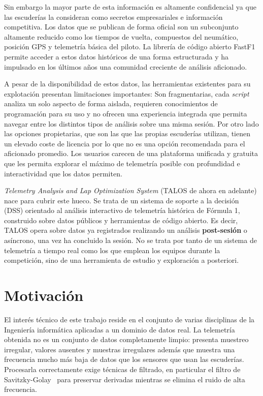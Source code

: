 \documentclass[12pt,a4paper,twoside,openright]{book}
\begin{document}
\medskip \noindent Sin embargo la mayor parte de esta información es altamente confidencial ya que las escuderías la consideran como secretos empresariales e información competitiva.
Los datos que se publican de forma oficial son un subconjunto altamente reducido como los tiempos de vuelta, compuestos del neumático, posición GPS y telemetría básica del piloto. La librería de código abierto FastF1 permite acceder a estos datos históricos de una forma estructurada y ha impulsado
en los últimos años una comunidad creciente de análisis aficionado.

\noindent A pesar de la disponibilidad de estos datos, las herramientas existentes para su explotación presentan limitaciones importantes: Son fragmentarias, cada \textit{script} analiza un solo aspecto de forma aislada, requieren conocimientos de programación para su uso y no ofrecen
una experiencia integrada que permita navegar entre los distintos tipos de análisis sobre una misma sesión. Por otro lado las opciones propietarias, que son las que las propias escuderías utilizan, tienen un elevado coste de licencia por lo que no es una opción recomendada para el aficionado promedio.
Los usuarios carecen de una plataforma unificada y gratuita que les permita explorar el máximo de telemetría posible con profundidad e interactividad que los datos permiten.

\noindent \textit{Telemetry Analysis and Lap Optimization System} (TALOS de ahora en adelante) nace para cubrir este hueco. Se trata de un sistema de soporte a la decisión (DSS) orientado al análisis interactivo de telemetría histórica de Fórmula 1, construido sobre datos públicos y herramientas de código abierto.
Es decir, TALOS opera sobre datos ya registrados realizando un análisis \textbf{post-sesión} o asíncrono, una vez ha concluido la sesión. No se trata por tanto de un sistema de telemetría a tiempo real como los que emplean los equipos durante la competición, sino de una herramienta de estudio y exploración a posteriori.
\section{Motivación}
El interés técnico de este trabajo reside en el conjunto de varias disciplinas de la Ingeniería informática aplicadas a un dominio de datos real. La telemetría obtenida no es un conjunto de datos completamente limpio:
presenta muestreo irregular, valores ausentes y muestras irregulares además que muestra una frecuencia mucho más baja de datos que los sensores que usan las escuderías.
Procesarla correctamente exige técnicas de filtrado, en particular el filtro de Savitzky-Golay~\cite{savgol1964} para preservar derivadas mientras se elimina el ruido de alta frecuencia.
\end{document}
